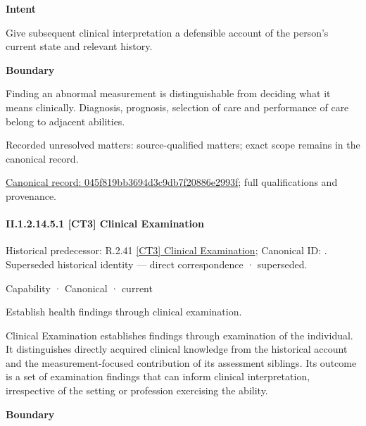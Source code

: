 \textbf{Intent}



Give subsequent clinical interpretation a defensible account of the person's current state and relevant history.



\textbf{Boundary}



Finding an abnormal measurement is distinguishable from deciding what it means clinically. Diagnosis, prognosis, selection of care and performance of care belong to adjacent abilities.


{\small Recorded unresolved matters: source-qualified matters; exact scope remains in the canonical record.}\par
{\footnotesize \href{../../../../../../../continuum/strategy/capability/045f819bb3694d3c9db7f20886e2993f.md}{Canonical record: 045f819bb3694d3c9db7f20886e2993f}; full qualifications and provenance.}\par
\paragraph*{II.1.2.14.5.1 [CT3] Clinical Examination}
\label{navigation:II.1.2.14.5.1}

{\small Historical predecessor: R.2.41 \hyperref[element:8bc15e2b8f114deebcbbe3f2013a8147]{[CT3] Clinical Examination}; Canonical ID: \texttt{}. Superseded historical identity — direct correspondence · superseded.}\par
\label{element:8855d4d9e2954e0ab66ab65a556fc61a}
{\small Capability · Canonical · current}\par

Establish health findings through clinical examination.



Clinical Examination establishes findings through examination of the individual. It distinguishes directly acquired clinical knowledge from the historical account and the measurement-focused contribution of its assessment siblings. Its outcome is a set of examination findings that can inform clinical interpretation, irrespective of the setting or profession exercising the ability.



\textbf{Boundary}



